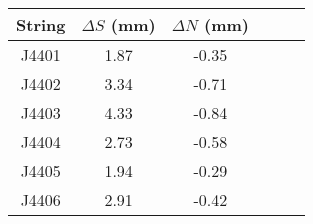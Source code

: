 \begin{tabular}{cccccc}
\toprule
String &  $\Delta S$ (mm) &  $\Delta N$ (mm) \\
\midrule
 J4401 &             1.87 &            -0.35 \\
 J4402 &             3.34 &            -0.71 \\
 J4403 &             4.33 &            -0.84 \\
 J4404 &             2.73 &            -0.58 \\
 J4405 &             1.94 &            -0.29 \\
 J4406 &             2.91 &            -0.42 \\
\bottomrule
\end{tabular}

